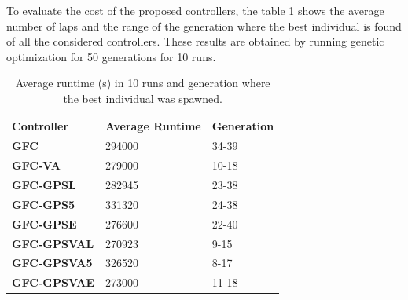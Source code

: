 \documentclass[10pt,journal,compsoc]{IEEEtran}
\begin{document}
To evaluate the cost of the proposed controllers, the table \ref{tab:time} shows the average number of laps %
and the range of the generation where the best individual is found of all the considered controllers. These results are obtained by running genetic
optimization for 50 generations for 10 runs.  

\begin{table}[!ht]
	\centering
	{\scriptsize
          \caption{Average runtime (s) in 10 runs
            and
                  generation where the best individual was spawned.}
		\label{tab:time}
		\begin{tabular}{|p{2.85cm}|p{1.65cm}|p{1.65cm}|}
			\hline 	
			\hline  
			Controller& \textbf{Average Runtime}&\textbf{Generation}\\
                  \hline \textbf{\textbf{{\sf GFC}}} \cite{salem_cig2018}&294000
                   &34-39\\
			\hline \textbf{{\sf GFC-VA}} \cite{DBLP:conf/cig/SalemMG19}&279000
			 	&10-18\\	
			\hline \textbf{{\sf GFC-GPSL}} \cite{DBLP:conf/cig/SalemMG19}& 282945
			 &23-38\\	
			\hline \textbf{{\sf GFC-GPS5}} \cite{DBLP:conf/cig/SalemMG19}&331320
				&24-38\\	
			\hline \textbf{{\sf GFC-GPSE}}&	276600
			 &22-40\\	
			\hline \textbf{{\sf GFC-GPSVAL}} \cite{DBLP:conf/cig/SalemMG19}& 270923
				&9-15\\	
			\hline\textbf{{\sf GFC-GPSVA5}} \cite{DBLP:conf/cig/SalemMG19}&	326520
			 &8-17\\	
			\hline\textbf{{\sf GFC-GPSVAE}}& 273000
				&11-18\\					
			\hline 
		\end{tabular}
		
	}
\end{table} 
\end{document}
